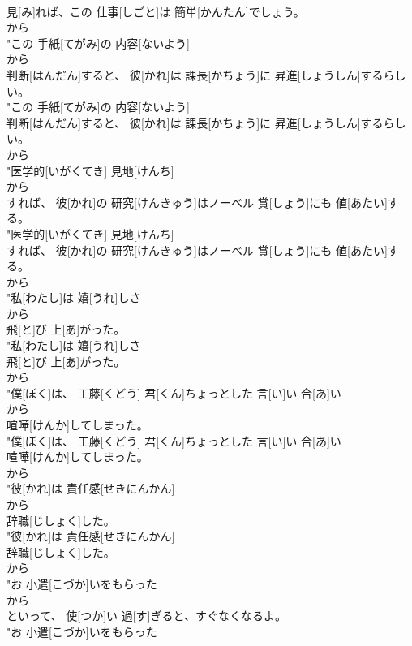 \documentclass[8pt]{extreport}
\begin{document}
\begin{CJK}{UTF8}{min}
\\	見[み]れば、この 仕事[しごと]は 簡単[かんたん]でしょう。
\\	から
\\	"この 手紙[てがみ]の 内容[ないよう]
\\	から
\\	判断[はんだん]すると、 彼[かれ]は 課長[かちょう]に 昇進[しょうしん]するらしい。
\\	"この 手紙[てがみ]の 内容[ないよう]
\\	判断[はんだん]すると、 彼[かれ]は 課長[かちょう]に 昇進[しょうしん]するらしい。
\\	から
\\	"医学的[いがくてき] 見地[けんち]
\\	から
\\	すれば、 彼[かれ]の 研究[けんきゅう]はノーベル 賞[しょう]にも 値[あたい]する。
\\	"医学的[いがくてき] 見地[けんち]
\\	すれば、 彼[かれ]の 研究[けんきゅう]はノーベル 賞[しょう]にも 値[あたい]する。
\\	から
\\	"私[わたし]は 嬉[うれ]しさ
\\	から
\\	飛[と]び 上[あ]がった。
\\	"私[わたし]は 嬉[うれ]しさ
\\	飛[と]び 上[あ]がった。
\\	から
\\	"僕[ぼく]は、 工藤[くどう] 君[くん]ちょっとした 言[い]い 合[あ]い
\\	から
\\	喧嘩[けんか]してしまった。
\\	"僕[ぼく]は、 工藤[くどう] 君[くん]ちょっとした 言[い]い 合[あ]い
\\	喧嘩[けんか]してしまった。
\\	から
\\	"彼[かれ]は 責任感[せきにんかん]
\\	から
\\	辞職[じしょく]した。
\\	"彼[かれ]は 責任感[せきにんかん]
\\	辞職[じしょく]した。
\\	から
\\	"お 小遣[こづか]いをもらった
\\	から
\\	といって、 使[つか]い 過[す]ぎると、すぐなくなるよ。
\\	"お 小遣[こづか]いをもらった

\end{CJK}
\end{document}
